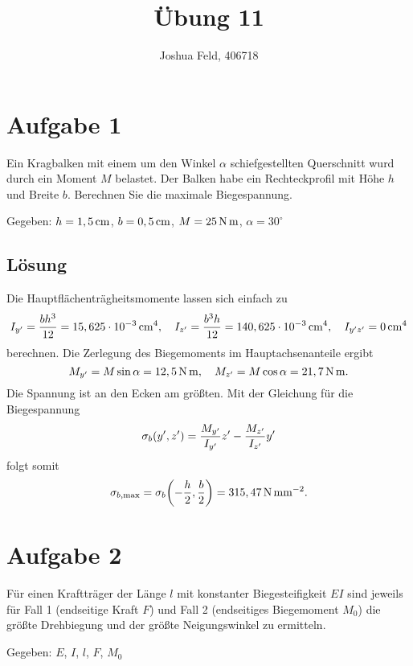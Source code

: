 \documentclass{exercise}
\institute{Lehr- und Forschungsgebiet Kontinuumsmechanik}
\title{Übung 11}
\author{Joshua Feld, 406718}
\begin{document}
    \maketitle
    
    
    \section*{Aufgabe 1}
    
    \begin{problem}
        Ein Kragbalken mit einem um den Winkel \(\alpha\) schiefgestellten Querschnitt wurd durch ein Moment \(M\) belastet.
        Der Balken habe ein Rechteckprofil mit Höhe \(h\) und Breite \(b\).
        Berechnen Sie die maximale Biegespannung.
        
        Gegeben: \(h = 1,5\,\si{\centi\meter}\), \(b = 0,5\,\si{\centi\meter}\), \(M = 25\,\si{\newton\meter}\), \(\alpha = 30^\circ\)
    \end{problem}
    
    \subsection*{Lösung}
    Die Hauptflächenträgheitsmomente lassen sich einfach zu
    \[
        I_{y'} = \frac{bh^3}{12} = 15,625 \cdot 10^{-3}\sis{\centi\meter\tothe{4}}, \quad I_{z'} = \frac{b^3 h}{12} = 140,625 \cdot 10^{-3}\sis{\centi\meter\tothe{4}}, \quad I_{y'z'} = 0\sis{\centi\meter\tothe{4}}
    \]
    berechnen.
    Die Zerlegung des Biegemoments im Hauptachsenanteile ergibt
    \[
        M_{y'} = M\sin\alpha = 12,5\,\si{\newton\meter}, \quad M_{z'} = M\cos\alpha = 21,7\,\si{\newton\meter}.
    \]
    Die Spannung ist an den Ecken am größten.
    Mit der Gleichung für die Biegespannung
    \[
        \sigma_b\parentheses*{y', z'} = \frac{M_{y'}}{I_{y'}}z' - \frac{M_{z'}}{I_{z'}}y'
    \]
    folgt somit
    \[
        \sigma_{b, \text{max}} = \sigma_b\parentheses*{-\frac{h}{2}, \frac{b}{2}} = 315,47\sis{\newton\per\milli\meter\squared}.
    \]
    
    
    \section*{Aufgabe 2}
    
    \begin{problem}
        Für einen Kraftträger der Länge \(l\) mit konstanter Biegesteifigkeit \(EI\) sind jeweils für Fall 1 (endseitige Kraft \(F\)) und Fall 2 (endseitiges Biegemoment \(M_0\)) die größte Drehbiegung und der größte Neigungswinkel zu ermitteln.
        
        Gegeben: \(E\), \(I\), \(l\), \(F\), \(M_0\)
    \end{problem}
    
\end{document}
